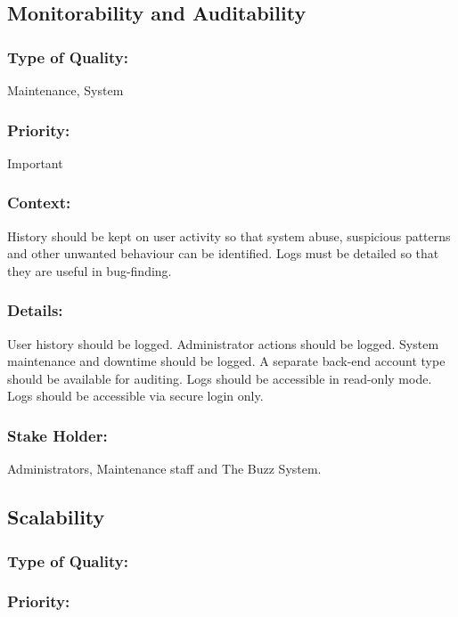 \documentclass[11pt]{article}
\begin{document}
	\subsection{Monitorability and Auditability}
		\subsubsection{Type of Quality:}
			\textbf{}Maintenance, System
		
		\subsubsection{Priority:}
			\textbf{}Important

		\subsubsection{Context:}
			\textbf{}History should be kept on user activity so that system abuse, suspicious patterns and other unwanted behaviour can be identified. Logs must be detailed so that they are useful in bug-finding.
		
		\subsubsection{Details:}
			\textbf{}User history should be logged. Administrator actions should be logged. System maintenance and downtime should be logged. A separate back-end account type should be available for auditing. Logs should be accessible in read-only mode. Logs should be accessible via secure login only.
		
		\subsubsection{Stake Holder:}
			\textbf{}Administrators, Maintenance staff and The Buzz System.
	
	\subsection{Scalability}	
		\subsubsection{Type of Quality:}
			\textbf{}
		
		\subsubsection{Priority:}
			\textbf{}
\end{document}
